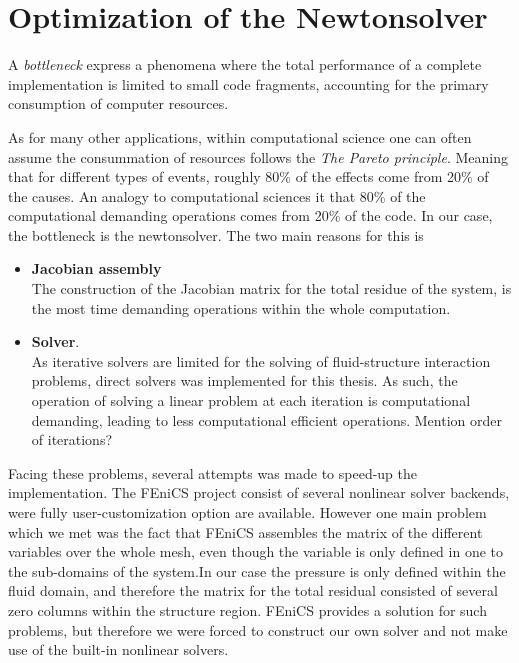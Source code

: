 \newpage
\section{Optimization of the Newtonsolver}
A \textit{bottleneck} express a phenomena where the total performance of a complete implementation is limited to small code fragments, accounting for the primary consumption of computer resources.

As for many other applications, within computational science one can often assume the consummation of resources follows the \textit{The Pareto principle}. Meaning that for different types of events, roughly 80\% of the effects come from 20\% of the causes. An analogy to computational sciences it that 80\% of the computational demanding operations comes from 20\% of the code. In our case, the bottleneck is the newtonsolver. The two main reasons for this is 

\begin{itemize}
\item \textbf{Jacobian assembly} \\
The construction of the Jacobian matrix for the total residue of the system, is the most time demanding operations within the whole computation. 
\item \textbf{Solver}. \\ 
As iterative solvers are limited for the solving of fluid-structure interaction problems, direct solvers was implemented for this thesis. As such, the operation of solving a linear problem at each iteration is computational demanding, leading to  less computational efficient operations. Mention order of iterations?
\end{itemize}

Facing these problems, several attempts was made to speed-up the implementation. The FEniCS project consist of several nonlinear solver backends, were fully user-customization option are available. However one main problem which we met was the fact that FEniCS assembles the matrix of the different variables over the whole mesh, even though the variable is only defined in one to the sub-domains of the system.In our case the pressure is only defined within the fluid domain, and therefore the matrix for the total residual consisted of several zero columns within the structure region. FEniCS provides a solution for such problems, but therefore we were forced to construct our own solver and not make use of the built-in nonlinear solvers. \\

